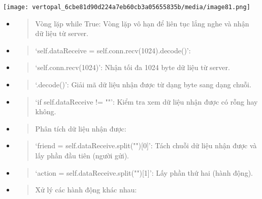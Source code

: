 \documentclass[a4paper]{article}
\begin{document}
\texttt{[image: vertopal\_6cbe81d90d224a7eb60cb3a05655835b/media/image81.png]}

\begin{itemize}
\item
  \begin{quote}
  Vòng lặp while True: Vòng lặp vô hạn để liên tục lắng nghe và nhận dữ
  liệu từ server.
  \end{quote}
\item
  \begin{quote}
  `self.dataReceive = self.conn.recv(1024).decode()':
  \end{quote}
\end{itemize}

\begin{itemize}
\item
  \begin{quote}
  `self.conn.recv(1024)': Nhận tối đa 1024 byte dữ liệu từ server.
  \end{quote}
\item
  \begin{quote}
  `.decode()': Giải mã dữ liệu nhận được từ dạng byte sang dạng chuỗi.
  \end{quote}
\end{itemize}

\begin{itemize}
\item
  \begin{quote}
  `if self.dataReceive != ""': Kiểm tra xem dữ liệu nhận được có rỗng
  hay không.
  \end{quote}
\item
  \begin{quote}
  Phân tích dữ liệu nhận được:
  \end{quote}
\end{itemize}

\begin{itemize}
\item
  \begin{quote}
  `friend = self.dataReceive.split("\textbar"){[}0{]}': Tách chuỗi dữ
  liệu nhận được và lấy phần đầu tiên (người gửi).
  \end{quote}
\item
  \begin{quote}
  `action = self.dataReceive.split("\textbar"){[}1{]}': Lấy phần thứ hai
  (hành động).
  \end{quote}
\end{itemize}

\begin{itemize}
\item
  \begin{quote}
  Xử lý các hành động khác nhau:
  \end{quote}
\end{itemize}
\end{document}
